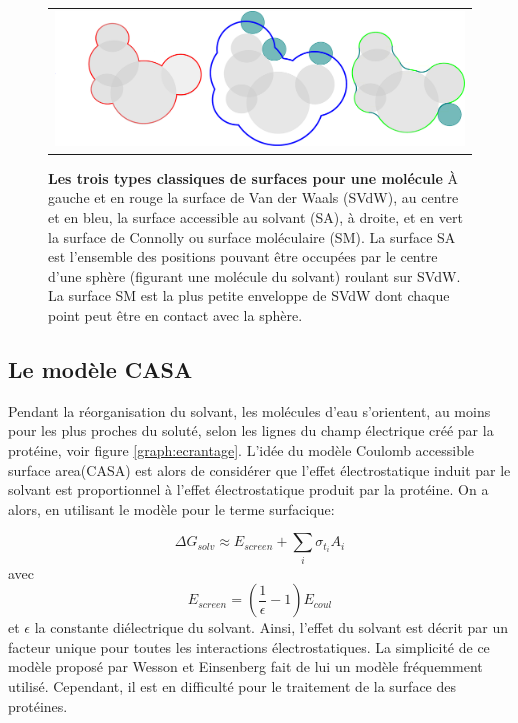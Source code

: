    \begin{figure}[!htbp]
     \centering
     \begin{tabular}{c}
       \includegraphics[width=13cm]{figure/surface.pdf} &
     \end{tabular}
     
     \caption{\textbf{Les trois types classiques de surfaces pour une molécule} À gauche et en rouge la surface de Van der Waals (SVdW), au centre et en bleu, la surface accessible au solvant (SA), à droite, et en vert  la surface de Connolly ou surface moléculaire (SM). La surface SA est l'ensemble des positions pouvant être occupées par le centre d'une sphère (figurant une molécule du solvant) roulant sur SVdW. La surface SM est la plus petite enveloppe de SVdW dont chaque point peut être en contact avec la sphère. } 
\label{graph:surface}
   \end{figure}
   

\subsection{Le modèle CASA}
\label{sub:CASA}
Pendant la réorganisation du solvant, les molécules d'eau s'orientent, au moins pour les plus proches du soluté, selon les lignes du champ électrique créé par la protéine, voir figure \ref{graph:ecrantage}. L'idée du modèle \og Coulomb accessible surface area\fg (CASA) est alors de considérer que l'effet électrostatique induit par le solvant est proportionnel à l'effet électrostatique produit par la protéine. On a  alors, en utilisant le modèle  pour le terme surfacique:

\begin{equation}
\Delta G_{solv} \approx E_{screen} + \sum_i \sigma_{t_i} A_i
\end{equation}
avec 
\begin{equation}
E_{screen} =  (\frac{1}{\epsilon} -1 )E_{coul}
\end{equation}
et $ \epsilon $ la constante diélectrique du solvant. Ainsi, l'effet du solvant est décrit par un facteur unique pour toutes les interactions électrostatiques. La simplicité de ce modèle proposé par Wesson et Einsenberg \cite{Wesson92} fait de lui un modèle fréquemment utilisé. Cependant, il est en difficulté pour le traitement de la surface des protéines.


